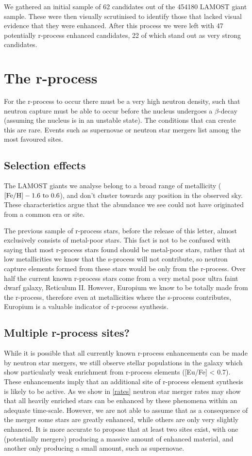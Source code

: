 \documentclass[a4paper,fleqn,usenatbib]{mnras}
\begin{document}
	We gathered an initial sample of 62 candidates out of the 454180 LAMOST giant sample. These were then visually scrutinised to identify those that lacked visual evidence that they were enhanced. After this process we were left with 47 potentially r-process enhanced candidates, 22 of which stand out as very strong candidates.
	
	\section{The r-process}
	For the r-process to occur there must be a very high neutron density, such that neutron capture must be able to occur before the nucleus undergoes a $\beta$-decay (assuming the nucleus is in an unstable state). The conditions that can create this are rare. Events such as supernovae or neutron star mergers list among the most favoured sites.
	
	\subsection{Selection effects}
	The LAMOST giants we analyse belong to a broad range of metallicity ($\rm{[Fe/H]} -1.6\ \rm{to}\ 0.6$), and don't cluster towards any position in the observed sky. These characteristics argue that the abundance we see could not have originated from a common era or site. 
	
	The previous sample of r-process stars, before the release of this letter, almost exclusively consists of metal-poor stars. This fact is not to be confused with saying that most r-process stars found should be metal-poor stars, rather that at low metallicities we know that the s-process will not contribute, so neutron capture elements formed from these stars would be only from the r-process. Over half the current known r-process stars come from a very metal poor ultra faint dwarf galaxy, Reticulum II. However, Europium we know to be totally made from the r-process, therefore even at metallicities where the s-process contributes, Europium is a valuable indicator of r-process synthesis.
	
	\subsection{Multiple r-process sites?}
	While it is possible that all currently known r-process enhancements can be made by neutron star mergers, we still observe stellar populations in the galaxy which show particularly weak enrichment from r-process elements ([Eu/Fe] < 0.7). These enhancements imply that an additional site of r-process element synthesis is likely to be active. As we show in \ref{rates}  neutron star merger rates may show that all heavily enriched stars can be enhanced by these phenomena within an adequate time-scale. However, we are not able to assume that as a consequence of the merger some stars are greatly enhanced, while others are only very slightly enhanced. It is more accurate to propose that at least two sites exist, with one (potentially mergers) producing a massive amount of enhanced material, and another only producing a small amount, such as supernovae. 
	
\end{document}
